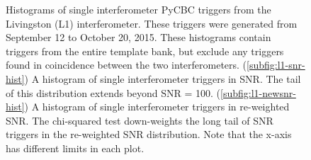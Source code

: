 \begin{figure}[!ht]%
\centering


  \caption[PyCBC SNR and re-weighted SNR histograms]{Histograms of single interferometer PyCBC %
           triggers from the Livingston (L1) interferometer. %
           These triggers were generated from September 12 to October 20, 2015. These histograms %
           contain triggers from the entire template bank, but %
           exclude any triggers found in coincidence between the two interferometers. %
           (\ref{subfig:l1-snr-hist}) A histogram of single interferometer triggers in SNR. %
           The tail of this distribution extends beyond SNR = 100. %
           (\ref{subfig:l1-newsnr-hist}) A histogram of single interferometer triggers in re-weighted SNR. %
           The chi-squared test down-weights the long tail of SNR triggers %
           in the re-weighted SNR distribution. Note that the x-axis has different %
           limits in each plot.}
  \label{fig:cbc-newsnr-histograms}
\end{figure}


